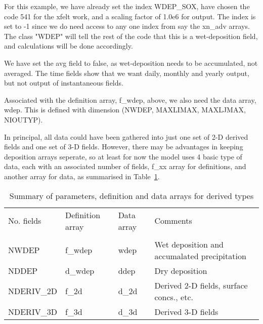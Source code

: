  \noindent
  For this example, we have already set the index WDEP\_SOX, have chosen the code
  541 for the xfelt work, and a scaling factor of 1.0e6 for output. The index
  is set to -1 since we do need access to any one index from say the xn\_adv arrays.
   The class
  "WDEP" will tell the rest of the code that this is a wet-deposition field,
   and  calculations will be done accordingly. 

   We have set the avg field to false, as wet-deposition needs to be accumulated,
   not averaged. The time fields show that we want daily, monthly and yearly
   output, but not output of instantaneous fields.

   Associated with the definition array, f\_wdep, above, we also need the 
   data array, wdep.  This is defined with dimension (NWDEP, MAXLIMAX, MAXLJMAX, NIOUTYP).
   

   In principal, all data could have been gathered into just one set of 2-D derived
   fields and one set of 3-D fields. However, there may be advantages
   in keeping deposition arrays seperate, so at least for now the model uses 4
   basic type of data, each with an associated number of fields, f\_xx array for
   definitions, and  another array for data, as summarised in Table~\ref{TABDRV}.

   \begin{table}[h]
   \caption{Summary of parameters, definition and data arrays for derived types}
   \label{TABDRV}
   \begin{tabular}{|lllp{6cm}|}\hline
     No. fields    &  Definition array & Data array  & Comments  \\
                   &               &                 &           \\
     NWDEP         &    f\_wdep    &    wdep   & Wet deposition and accumalated precipitation  \\
     NDDEP         &    d\_wdep    &    ddep   & Dry deposition   \\
     NDERIV\_2D     &    f\_2d      &    d\_2d   & Derived 2-D fields, surface concs., etc.  \\
     NDERIV\_3D     &    f\_3d      &    d\_3d   & Derived 3-D fields  \\ \hline
   \end{tabular}
   \end{table}
